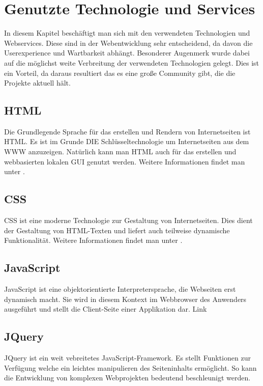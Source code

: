 \chapter{ Genutzte Technologie und Services}

In diesem Kapitel beschäftigt man sich mit den verwendeten Technologien und Webservices. Diese sind in der Webentwicklung sehr entscheidend, da davon die Userexperience und Wartbarkeit abhängt. Besonderer Augenmerk wurde dabei auf die möglichst weite Verbreitung der verwendeten Technologien gelegt. Dies ist ein Vorteil, da daraus resultiert das es eine große Community gibt, die die Projekte aktuell hält.

\section{HTML}
Die Grundlegende Sprache für das erstellen und Rendern von Internetseiten ist \ac{HTML}. Es ist im Grunde DIE Schlüsseltechnologie um Internetseiten aus dem \ac{WWW} anzuzeigen. Natürlich kann man \ac{HTML} auch für das erstellen und webbasierten lokalen \ac{GUI} genutzt werden. Weitere Informationen findet man unter  \cite{mozilla-html}.


\section{CSS}

\ac{CSS} ist eine moderne Technologie zur Gestaltung von Internetseiten. Dies dient der Gestaltung von HTML-Texten und liefert auch teilweise dynamische Funktionalität. Weitere Informationen findet man unter  \cite{mozilla-css}.

\section{JavaScript}

JavaScript ist eine objektorientierte  Interpretersprache, die Webseiten erst dynamisch macht. Sie wird in diesem Kontext im Webbrowser des Anwenders ausgeführt und stellt die Client-Seite einer Applikation dar.  Link

\section{JQuery}

JQuery ist ein weit vebreitetes JavaScript-Framework. Es stellt  Funktionen zur Verfügung welche ein leichtes manipulieren des Seiteninhalts ermöglicht. So kann die Entwicklung von komplexen Webprojekten bedeutend beschleunigt werden. 

